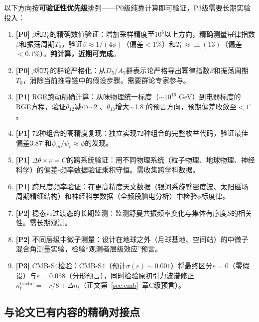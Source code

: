 以下方向按\textbf{可验证性优先级}排列——P0级纯靠计算即可验证，P3级需要长期实验投入：

\begin{enumerate}
\item \textbf{[P0]} $\beta$和$T_0$的精确数值验证：增加采样精度至$10^6$以上方向，精确测量幂律指数$\beta$和振荡周期$T_0$，验证$\beta \approx 1/(4\phi)$（偏差$<1\%$）和$T_0 \approx \ln(13)$（偏差$<0.1\%$）。\textbf{纯计算，近期可完成}。

\item \textbf{[P0]} $\beta$和$T_0$的群论严格化：从$D_5$/$A_5$群表示论严格导出幂律指数$\beta$和振荡周期$T_0$，消除当前推导链中的假设步骤。需要群论专家参与。

\item \textbf{[P1]} RGE跑动精确计算：从味物理统一标度（$\sim 10^{16}$ GeV）到电弱标度的RGE方程，验证$\theta_{12}$减小$\sim$2$^\circ$、$\theta_{13}$增大$\sim$1.8$^\circ$的预言方向，预期偏差收敛至$<1^\circ$。

\item \textbf{[P1]} 72种组合的高精度复现：独立实现72种组合的完整枚举代码，验证最佳偏差3.87$^\circ$和$\psi_m/\psi_r \approx \phi$的发现。

\item \textbf{[P1]} $\Delta\theta \times \nu = C$的跨系统验证：用不同物理系统（粒子物理、地球物理、神经科学）的偏差-频率数据验证乘积守恒。需收集跨学科数据。

\item \textbf{[P1]} 跨尺度频率验证：在更高精度天文数据（银河系旋臂密度波、太阳磁场周期精细结构）和神经科学数据（全频段脑电分析）中检验$\phi$标度律。

\item \textbf{[P2]} 稳态vs过渡态的长期监测：监测舒曼共振频率变化与集体有序度$S$的相关性。需长期观测。

\item \textbf{[P2]} 不同层级中微子测量：设计在地球之外（月球基地、空间站）的中微子混合角测量实验，检验``观测者层级效应''预言。

\item \textbf{[P3]} CMB-S4检验：CMB-S4（预计$\sigma(\varepsilon) \sim 0.001$）将最终区分$\varepsilon = 0$（零假设）与$\varepsilon = 0.058$（分形预言），同时检验原初引力波谱修正$n_t^{\text{fractal}} = -r/8 + \Delta n_t$（正文第~\ref{sec:cmb}~章C级预言）。
\end{enumerate}

\subsection{与论文已有内容的精确对接点}
\label{subsec:docking_points}

